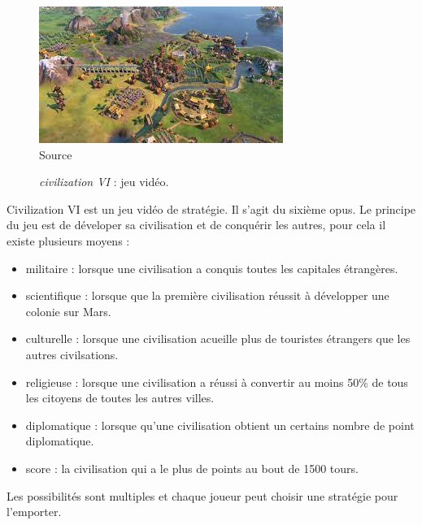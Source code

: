 \begin{figure}[H]
    \centering
    \includegraphics[scale=0.8]{data/civilization.jpeg}\\
    Source 
    \caption{\textit{civilization VI} : jeu vidéo.}
\end{figure}
Civilization VI est un jeu vidéo de stratégie. Il s'agit du sixième opus.
Le principe du jeu est de déveloper sa civilisation et de conquérir les autres, pour cela il existe plusieurs moyens :
\begin{itemize}
    \item militaire : lorsque une civilisation a conquis toutes les capitales étrangères.
    \item scientifique : lorsque que la première civilisation réussit à développer une colonie sur Mars.
    \item culturelle : lorsque une civilisation acueille plus de touristes étrangers que les autres civilsations.
    \item religieuse : lorsque une civilisation a réussi à convertir au moins 50\% de tous les citoyens de toutes les autres villes.
    \item diplomatique : lorsque qu'une civilisation obtient un certains nombre de point diplomatique.
    \item score : la civilisation qui a le plus de points au bout de 1500 tours.
\end{itemize}
Les possibilités sont multiples et chaque joueur peut choisir une stratégie pour l'emporter.


